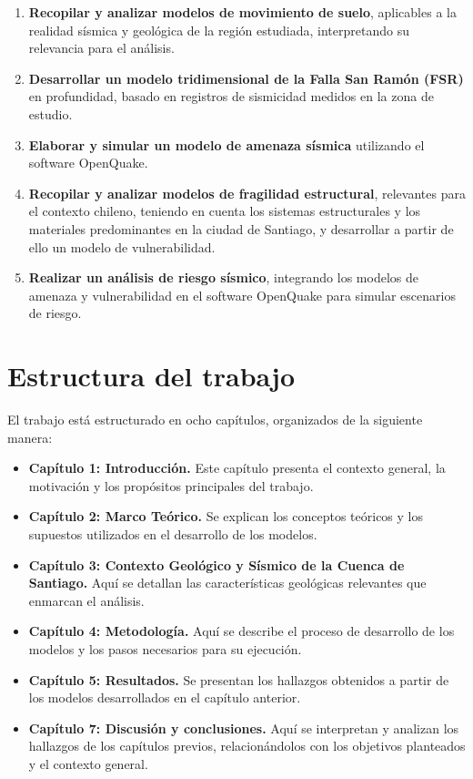 \begin{enumerate}
    \item \textbf{Recopilar y analizar modelos de movimiento de suelo}, aplicables a la realidad sísmica y geológica de la región estudiada, interpretando su relevancia para el análisis.
    \item \textbf{Desarrollar un modelo tridimensional de la Falla San Ramón (FSR)} en profundidad, basado en registros de sismicidad medidos en la zona de estudio.
    \item \textbf{Elaborar y simular un modelo de amenaza sísmica} utilizando el software OpenQuake.
    \item \textbf{Recopilar y analizar modelos de fragilidad estructural}, relevantes para el contexto chileno, teniendo en cuenta los sistemas estructurales y los materiales predominantes en la ciudad de Santiago, y desarrollar a partir de ello un modelo de vulnerabilidad.
    \item \textbf{Realizar un análisis de riesgo sísmico}, integrando los modelos de amenaza y vulnerabilidad en el software OpenQuake para simular escenarios de riesgo.
\end{enumerate}

\newpage

\section{Estructura del trabajo}

El trabajo está estructurado en ocho capítulos, organizados de la siguiente manera:

\begin{itemize}
    \item \textbf{Capítulo 1: Introducción.} Este capítulo presenta el contexto general, la motivación y los propósitos principales del trabajo.
    \item \textbf{Capítulo 2: Marco Teórico.} Se explican los conceptos teóricos y los supuestos utilizados en el desarrollo de los modelos.
    \item \textbf{Capítulo 3: Contexto Geológico y Sísmico de la Cuenca de Santiago.} Aquí se detallan las características geológicas relevantes que enmarcan el análisis.
    \item \textbf{Capítulo 4: Metodología.} Aquí se describe el proceso de desarrollo de los modelos y los pasos necesarios para su ejecución.
    \item \textbf{Capítulo 5: Resultados.} Se presentan los hallazgos obtenidos a partir de los modelos desarrollados en el capítulo anterior.
    \item \textbf{Capítulo 7: Discusión y conclusiones.} Aquí se interpretan y analizan los hallazgos de los capítulos previos, relacionándolos con los objetivos planteados y el contexto general.
\end{itemize}
